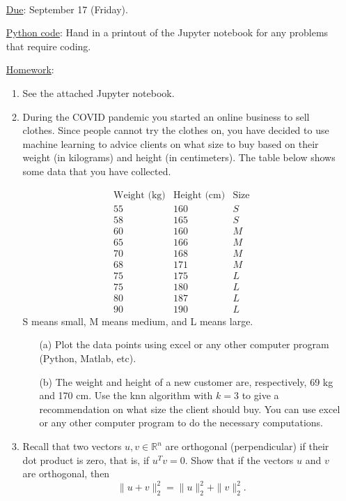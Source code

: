 \documentclass{article}
\begin{document}
\\


\bigskip

\begin{itemize}
\item[\underline{Due}:] September 17 (Friday).
\item[\underline{Python code}:] Hand in a printout of the Jupyter notebook for any problems that require coding.
\item[\underline{Homework}:]
\begin{enumerate}
\item
See the attached Jupyter notebook.

\item
During the COVID pandemic you started an online business to sell clothes. Since people cannot try the clothes on, you have decided to use machine learning to advice clients on what size to buy based on their weight (in kilograms) and height (in centimeters). 
The table below shows some data that you have collected.


$$\begin{array}{ccc} \mbox{Weight (kg)} & \mbox{Height (cm)} & \mbox{Size} \\ \hline 55 & 160 & S \\ 58 & 165 & S\\60 & 160 & M\\ 65 & 166 & M\\ 70 & 168 & M \\ 68 & 171 & M \\ 75 & 175 & L \\ 75 & 180 & L \\ 80& 187 & L \\ 90 & 190 &  L \end{array} $$
S means small, M means medium, and L means large.

\begin{enumerate}
\item[\rm (a)] Plot the data points using excel or any other computer program (Python, Matlab, etc).
\item[\rm (b)] The weight and height of a new customer are, respectively, 69 kg and 170 cm. 
Use the knn algorithm with $k=3$ to give a recommendation on what size the client should buy. 
You can use excel or any other computer program to do the necessary computations. 
\end{enumerate}

\bigskip

\item
Recall that two vectors $u,v\in\mathbb{R}^n$ are orthogonal (perpendicular) if their dot product is zero, that is, if $u^Tv=0$.
Show that if the vectors $u$ and $v$ are orthogonal, then 
\[
\|u+v\|_2^2 = \|u\|_2^2 + \|v\|_2^2.
\]


\end{enumerate}
\end{itemize}
\end{document}

